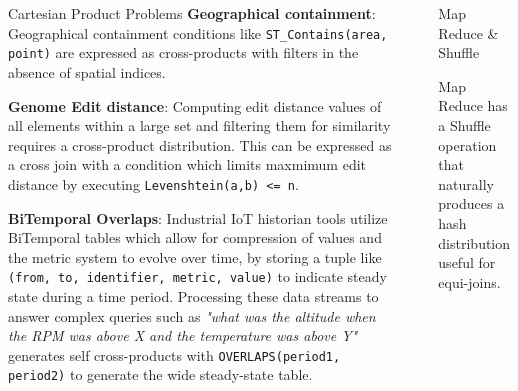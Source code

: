 \documentclass[final]{beamer}
\newlength{\sepwid}
\newlength{\onecolwid}
\newlength{\twocolwid}
\begin{document}
\begin{frame}[t]
\begin{columns}[t]
\begin{column}{\onecolwid}
\begin{block}{Cartesian Product Problems}
\textbf{Geographical containment}:
Geographical containment conditions like \texttt{ST\_Contains(area, point)} are expressed as cross-products with filters in the absence of spatial indices.

\textbf{Genome Edit distance}:
Computing edit distance values of all elements within a large set and filtering them for similarity requires a cross-product distribution. This can 
be expressed as a cross join with a condition which limits maxmimum edit distance by executing \texttt{Levenshtein(a,b) <= n}.

\textbf{BiTemporal Overlaps}:
Industrial IoT historian tools utilize BiTemporal tables which allow for compression of values and the metric system to evolve over time, by storing a
tuple like \texttt{(from, to, identifier, metric, value)} to indicate steady state during a time period.
Processing these data streams to answer complex queries such as \textit{"what was the altitude when the RPM was above X and the temperature was above Y"}
generates self cross-products with \texttt{OVERLAPS(period1, period2)} to generate the wide steady-state table.
\end{block}


\end{column} %

\begin{column}{\sepwid}\end{column} %

\begin{column}{\twocolwid} %

\begin{columns}[t,totalwidth=\twocolwid] %

\begin{column}{\onecolwid}\vspace{-.6in} %


\begin{block}{Map Reduce \& Shuffle}

Map Reduce has a Shuffle operation that naturally produces a hash distribution useful for equi-joins.


\end{block}
\end{column}
\end{columns}
\end{column}
\end{columns}
\end{frame}
\end{document}
